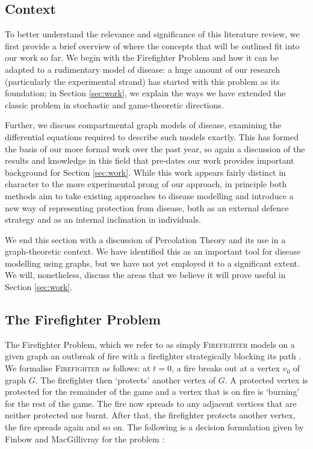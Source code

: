 \documentclass[../report.tex]{subfiles}
\begin{document}
\subsection{Context}

To better understand the relevance and significance of this literature review, we first provide a brief overview of where the concepts that will be outlined fit into our work so far. We begin with the Firefighter Problem and how it can be adapted to a rudimentary model of disease: a huge amount of our research (particularly the experimental strand) has started with this problem as its foundation; in Section \ref{sec:work}, we explain the ways we have extended the classic problem in stochastic and game-theoretic directions.

Further, we discuss compartmental graph models of disease, examining the differential equations required to describe such models exactly. This has formed the basis of our more formal work over the past year, so again a discussion of the results and knowledge in this field that pre-dates our work provides important background for Section \ref{sec:work}. While this work appears fairly distinct in character to the more experimental prong of our approach, in principle both methods aim to take existing approaches to disease modelling and introduce a new way of representing protection from disease, both as an external defence strategy and as an internal inclination in individuals.

We end this section with a discussion of Percolation Theory and its use in a graph-theoretic context. We have identified this as an important tool for disease modelling using graphs, but we have not yet employed it to a significant extent. We will, nonetheless, discuss the areas that we believe it will prove useful in Section \ref{sec:work}.

\subsection{The Firefighter Problem}

The Firefighter Problem, which we refer to as simply {\scshape Firefighter} models on a given graph an outbreak of fire with a firefighter strategically blocking its path \cite{hartnell_1995}. We formalise {\scshape Firefighter} as follows: at $t=0$, a fire breaks out at a vertex $v_0$ of graph $G$. The firefighter then `protects' another vertex of $G$. A protected vertex is protected for the remainder of the game and a vertex that is on fire is `burning' for the rest of the game. The fire now spreads to any adjacent vertices that are neither protected nor burnt. After that, the firefighter protects another vertex, the fire spreads again and so on. The following is a decision formulation given by Finbow and MacGillivray for the problem \cite{finbow_2009}:
\vspace{1mm}
\end{document}
